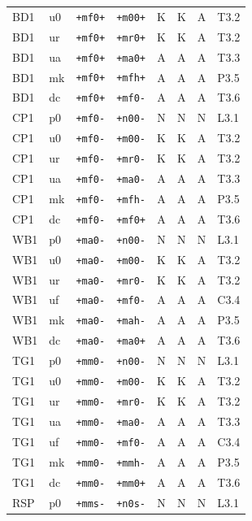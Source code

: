 {\begin{longtable}{@{}llllcccl@{}}
BD1 & u0 & \texttt{+mf0+} & \texttt{+m00+} & K & K & A & T3.2 \\
BD1 & ur & \texttt{+mf0+} & \texttt{+mr0+} & K & K & A & T3.2 \\
BD1 & ua & \texttt{+mf0+} & \texttt{+ma0+} & A & A & A & T3.3 \\
BD1 & mk & \texttt{+mf0+} & \texttt{+mfh+} & A & A & A & P3.5 \\
BD1 & dc & \texttt{+mf0+} & \texttt{+mf0-} & A & A & A & T3.6 \\
CP1 & p0 & \texttt{+mf0-} & \texttt{+n00-} & N & N & N & L3.1 \\
CP1 & u0 & \texttt{+mf0-} & \texttt{+m00-} & K & K & A & T3.2 \\
CP1 & ur & \texttt{+mf0-} & \texttt{+mr0-} & K & K & A & T3.2 \\
CP1 & ua & \texttt{+mf0-} & \texttt{+ma0-} & A & A & A & T3.3 \\
CP1 & mk & \texttt{+mf0-} & \texttt{+mfh-} & A & A & A & P3.5 \\
CP1 & dc & \texttt{+mf0-} & \texttt{+mf0+} & A & A & A & T3.6 \\
WB1 & p0 & \texttt{+ma0-} & \texttt{+n00-} & N & N & N & L3.1 \\
WB1 & u0 & \texttt{+ma0-} & \texttt{+m00-} & K & K & A & T3.2 \\
WB1 & ur & \texttt{+ma0-} & \texttt{+mr0-} & K & K & A & T3.2 \\
WB1 & uf & \texttt{+ma0-} & \texttt{+mf0-} & A & A & A & C3.4 \\
WB1 & mk & \texttt{+ma0-} & \texttt{+mah-} & A & A & A & P3.5 \\
WB1 & dc & \texttt{+ma0-} & \texttt{+ma0+} & A & A & A & T3.6 \\
TG1 & p0 & \texttt{+mm0-} & \texttt{+n00-} & N & N & N & L3.1 \\
TG1 & u0 & \texttt{+mm0-} & \texttt{+m00-} & K & K & A & T3.2 \\
TG1 & ur & \texttt{+mm0-} & \texttt{+mr0-} & K & K & A & T3.2 \\
TG1 & ua & \texttt{+mm0-} & \texttt{+ma0-} & A & A & A & T3.3 \\
TG1 & uf & \texttt{+mm0-} & \texttt{+mf0-} & A & A & A & C3.4 \\
TG1 & mk & \texttt{+mm0-} & \texttt{+mmh-} & A & A & A & P3.5 \\
TG1 & dc & \texttt{+mm0-} & \texttt{+mm0+} & A & A & A & T3.6 \\
RSP & p0 & \texttt{+mms-} & \texttt{+n0s-} & N & N & N & L3.1 \\

\end{longtable}}
